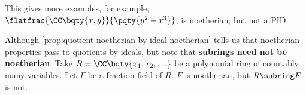 This gives more examples, for example, \(\flatfrac{\CC\bqty{x, y}}{\pqty{y^2 - x^3}}\), is noetherian, but not a PID.

\begin{remark}
    Although \autoref{prop:quotient-noetherian-by-ideal-noetherian} tells us that noetherian properties pass to quotients by ideals, but note that \textbf{subrings need not be noetherian}. Take \(R = \CC\bqty{x_1, x_2, \ldots}\) be a polynomial ring of countably many variables. Let \(F\) be a fraction field of \(R\). \(F\) is noetherian, but \(R \subring F\) is not.
\end{remark}